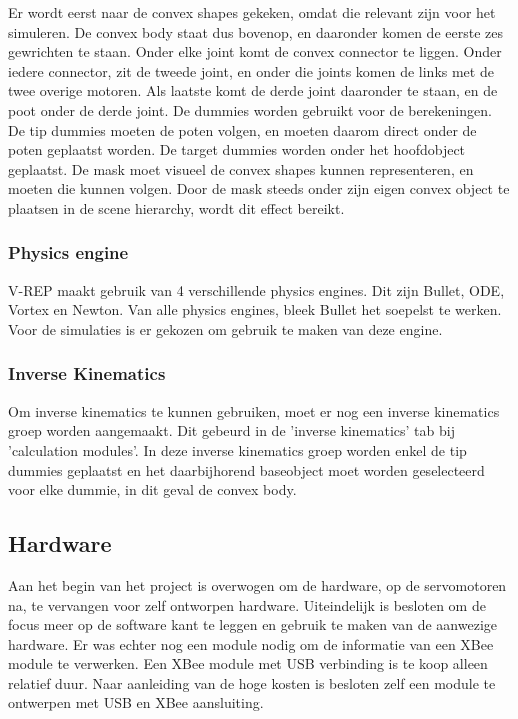 \documentclass[10pt,a4paper]{article}
\begin{document}
Er wordt eerst naar de convex shapes gekeken, omdat die relevant zijn voor het simuleren. De convex body staat dus bovenop, en daaronder komen de eerste zes gewrichten te staan. Onder elke joint komt de convex connector te liggen. Onder iedere connector, zit de tweede joint, en onder die joints komen de links met de twee overige motoren. Als laatste komt de derde joint daaronder te staan, en de poot onder de derde joint. De dummies worden gebruikt voor de berekeningen. De tip dummies moeten de poten volgen, en moeten daarom direct onder de poten geplaatst worden. De target dummies worden onder het hoofdobject geplaatst.
De mask moet visueel de convex shapes kunnen representeren, en moeten die kunnen volgen. Door de mask steeds onder zijn eigen convex object te plaatsen in de scene hierarchy, wordt dit effect bereikt.

\subsubsection{Physics engine}
V-REP maakt gebruik van 4 verschillende physics engines. Dit zijn Bullet, ODE, Vortex en Newton. Van alle physics engines, bleek Bullet het soepelst te werken. Voor de simulaties is er gekozen om gebruik te maken van deze engine.

\subsubsection{Inverse Kinematics}
Om inverse kinematics te kunnen gebruiken, moet er nog een inverse kinematics groep worden aangemaakt. Dit gebeurd in de 'inverse kinematics' tab bij 'calculation modules'. In deze inverse kinematics groep worden enkel de tip dummies geplaatst en het daarbijhorend baseobject moet worden geselecteerd voor elke dummie, in dit geval de convex body.

\newpage
\subsection{Hardware}
Aan het begin van het project is overwogen om de hardware, op de servomotoren na, te vervangen voor zelf ontworpen hardware. Uiteindelijk is besloten om de focus meer op de software kant te leggen en gebruik te maken van de aanwezige hardware. Er was echter nog een module nodig om de informatie van een XBee module te verwerken. Een XBee module met USB verbinding is te koop alleen relatief duur. Naar aanleiding van de hoge kosten is besloten zelf een module te ontwerpen met USB en XBee aansluiting.
\end{document}
